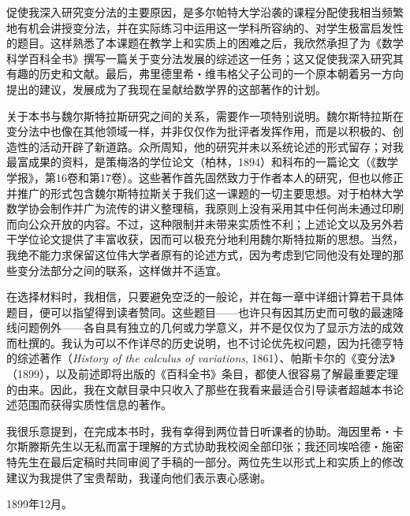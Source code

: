 \documentclass[11pt,a4paper,leqno]{article}
\begin{document}
促使我深入研究变分法的主要原因，是多尔帕特大学沿袭的课程分配使我相当频繁地有机会讲授变分法，并在实际练习中运用这一学科所容纳的、对学生极富启发性的题目。这样熟悉了本课题在教学上和实质上的困难之后，我欣然承担了为《数学科学百科全书》撰写一篇关于变分法发展的综述这一任务；这又促使我深入研究其有趣的历史和文献。最后，弗里德里希・维韦格父子公司的一个原本朝着另一方向提出的建议，发展成为了我现在呈献给数学界的这部著作的计划。

关于本书与魏尔斯特拉斯研究之间的关系，需要作一项特别说明。魏尔斯特拉斯在变分法中也像在其他领域一样，并非仅仅作为批评者发挥作用，而是以积极的、创造性的活动开辟了新道路。众所周知，他的研究并未以系统论述的形式留存；对我最富成果的资料，是策梅洛的学位论文（柏林，1894）和科布的一篇论文（《数学学报》，第16卷和第17卷）。这些著作首先固然致力于作者本人的研究，但也以修正并推广的形式包含魏尔斯特拉斯关于我们这一课题的一切主要思想。对于柏林大学数学协会制作并广为流传的讲义整理稿，我原则上没有采用其中任何尚未通过印刷而向公众开放的内容。不过，这种限制并未带来实质性不利；上述论文以及另外若干学位论文提供了丰富收获，因而可以极充分地利用魏尔斯特拉斯的思想。当然，我绝不能力求保留这位伟大学者原有的论述方式，因为考虑到它同他没有处理的那些变分法部分之间的联系，这样做并不适宜。

在选择材料时，我相信，只要避免空泛的一般论，并在每一章中详细计算若干具体题目，便可以指望得到读者赞同。这些题目——也许只有因其历史而可敬的最速降线问题例外——各自具有独立的几何或力学意义，并不是仅仅为了显示方法的成效而杜撰的。我认为可以不作详尽的历史说明，也不讨论优先权问题，因为托德亨特的综述著作（\textit{History of the calculus of variations}, 1861）、帕斯卡尔的《变分法》（1899），以及前述即将出版的《百科全书》条目，都使人很容易了解最重要定理的由来。因此，我在文献目录中只收入了那些在我看来最适合引导读者超越本书论述范围而获得实质性信息的著作。

我很乐意提到，在完成本书时，我有幸得到两位昔日听课者的协助。海因里希・卡尔斯滕斯先生以无私而富于理解的方式协助我校阅全部印张；我还同埃哈德・施密特先生在最后定稿时共同审阅了手稿的一部分。两位先生以形式上和实质上的修改建议为我提供了宝贵帮助，我谨向他们表示衷心感谢。

\medskip
1899年12月。

\end{document}
